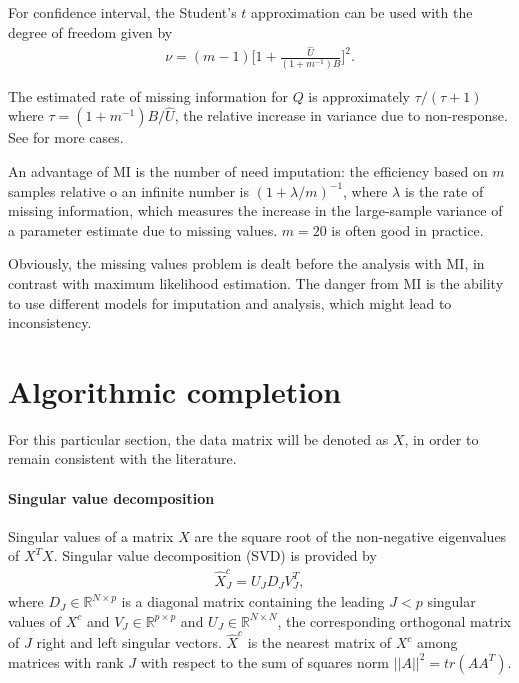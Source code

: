 For confidence interval, the Student's $t$ approximation can be used with the
degree of freedom given by
\begin{align*}
\nu = (m-1)\Big[1 + \frac{\hat U}{(1 + m^{-1})B} \Big]^2.
\end{align*}

The estimated rate of missing information for $Q$ is approximately
$\tau/(\tau+1)$ where $\tau = (1 + m^{-1})B/\hat U$, the relative increase in
variance due to non-response. See \cite{schafer1997analysis} for more cases.

An advantage of MI is the number of need imputation: the efficiency based on
$m$ samples relative o an infinite number is $(1 + \lambda/m)^{-1}$, where
$\lambda$ is the rate of missing information, which measures the increase in
the large-sample variance of a parameter estimate due to missing values. $m=20$
is often good in practice.

Obviously, the missing values problem is dealt before the analysis with MI, in
contrast with maximum likelihood estimation. The danger from MI is the ability
to use different models for imputation and analysis, which might lead to
inconsistency.

\section{Algorithmic completion}
\label{sec:compl-case}
For this particular section, the data matrix will be denoted as $X$, in order
to remain consistent with the literature.

\paragraph{Singular value decomposition} Singular values of a matrix $X$ are
the square root of the non-negative eigenvalues of $X^TX$. Singular value
decomposition (SVD) is provided by
\begin{align}\label{eq:svd}
\hat X^c_J = U_JD_JV_J^T,
\end{align}
where $D_J \in \mathbb{R}^{N \times p}$ is a diagonal matrix containing the
leading $J < p$ singular values of $X^c$ and $V_J \in \mathbb{R}^{p \times p}$
and $U_J \in \mathbb{R}^{N \times N}$, the corresponding orthogonal matrix of
$J$ right and left singular vectors. $\hat X^c$ is the nearest matrix of $X^c$
among matrices with rank $J$ with respect to the sum of squares norm $\vert
\vert A \vert \vert ^2 = tr(AA^T)$.

